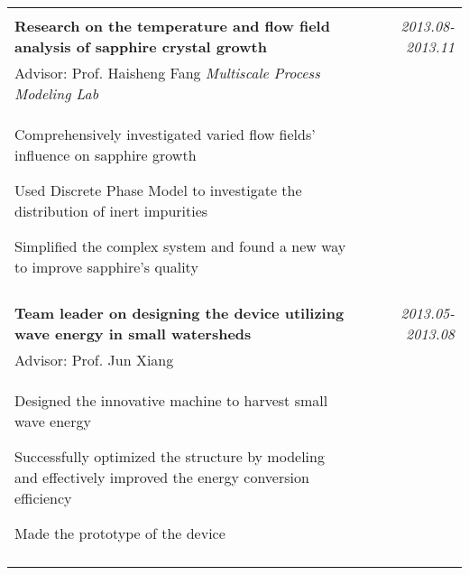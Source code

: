 \documentclass[a4paper,10pt]{article}
\begin{document}
\begin{tabular}{p{13.5cm}p{0.5cm}r}
\multicolumn{3}{c}{} \\
\textbf{Research on the temperature and flow field analysis of sapphire crystal growth}  && \emph{2013.08-2013.11} \\
\hspace{1em} Advisor: Prof. Haisheng Fang \hspace{6.7em} \emph{Multiscale Process Modeling Lab}  && \vspace{-0.5em} \\
\begin{compactitem}
       \item Comprehensively investigated varied flow fields' influence on sapphire growth\vspace{0.2em}
       \item Used Discrete Phase Model to investigate the distribution of inert impurities\vspace{0.2em}
       \item Simplified the complex system and found a new way to improve sapphire's quality %
     \end{compactitem}&&\vspace{-2.2em} \\
\multicolumn{3}{c}{} \\
 \textbf{Team leader on designing the device utilizing wave energy in small watersheds}&&  \emph{2013.05-2013.08} \\
\hspace{1em}  Advisor: Prof. Jun Xiang  & &\vspace{-0.5em}\\
\begin{compactitem}
       \item Designed the innovative machine to harvest small wave energy\vspace{0.2em}
       \item Successfully optimized the structure by modeling and effectively improved the energy conversion efficiency\vspace{0.2em}
       \item Made the prototype of the device
     \end{compactitem}&&\vspace{-1em} \\
\multicolumn{3}{c}{} \vspace{-1.5em} \\


\end{tabular}
\end{document}
